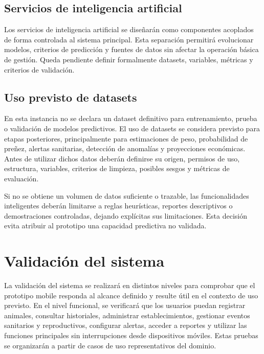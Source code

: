 \subsection{Servicios de inteligencia artificial}

Los servicios de inteligencia artificial se dise\~nar\'an como componentes acoplados de forma controlada al sistema principal. Esta separaci\'on permitir\'a evolucionar modelos, criterios de predicci\'on y fuentes de datos sin afectar la operaci\'on b\'asica de gesti\'on. Queda pendiente definir formalmente datasets, variables, m\'etricas y criterios de validaci\'on.

\subsection{Uso previsto de datasets}

En esta instancia no se declara un dataset definitivo para entrenamiento, prueba o validaci\'on de modelos predictivos. El uso de datasets se considera previsto para etapas posteriores, principalmente para estimaciones de peso, probabilidad de pre\~nez, alertas sanitarias, detecci\'on de anomal\'ias y proyecciones econ\'omicas. Antes de utilizar dichos datos deber\'an definirse su origen, permisos de uso, estructura, variables, criterios de limpieza, posibles sesgos y m\'etricas de evaluaci\'on.

Si no se obtiene un volumen de datos suficiente o trazable, las funcionalidades inteligentes deber\'an limitarse a reglas heur\'isticas, reportes descriptivos o demostraciones controladas, dejando expl\'icitas sus limitaciones. Esta decisi\'on evita atribuir al prototipo una capacidad predictiva no validada.

\section{Validaci\'on del sistema}

La validaci\'on del sistema se realizar\'a en distintos niveles para comprobar que el prototipo mobile responda al alcance definido y resulte \'util en el contexto de uso previsto. En el nivel funcional, se verificar\'a que los usuarios puedan registrar animales, consultar historiales, administrar establecimientos, gestionar eventos sanitarios y reproductivos, configurar alertas, acceder a reportes y utilizar las funciones principales sin interrupciones desde dispositivos m\'oviles. Estas pruebas se organizar\'an a partir de casos de uso representativos del dominio.

